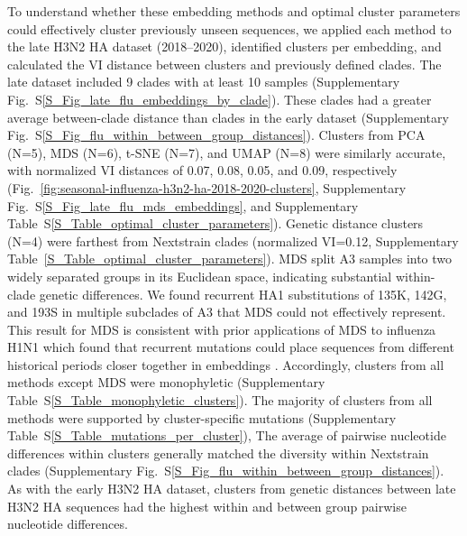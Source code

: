 \documentclass[webpdf,contemporary,large,single]{oup-authoring-template}%
\theoremstyle{thmstyleone}%
\theoremstyle{thmstyletwo}%
\theoremstyle{thmstylethree}%
\begin{document}
To understand whether these embedding methods and optimal cluster parameters could effectively cluster previously unseen sequences, we applied each method to the late H3N2 HA dataset (2018--2020), identified clusters per embedding, and calculated the VI distance between clusters and previously defined clades.
The late dataset included 9 clades with at least 10 samples (Supplementary Fig.~S\ref{S_Fig_late_flu_embeddings_by_clade}).
These clades had a greater average between-clade distance than clades in the early dataset (Supplementary Fig.~S\ref{S_Fig_flu_within_between_group_distances}).
Clusters from PCA (N=5), MDS (N=6), t-SNE (N=7), and UMAP (N=8) were similarly accurate, with normalized VI distances of 0.07, 0.08, 0.05, and 0.09, respectively (Fig.~\ref{fig:seasonal-influenza-h3n2-ha-2018-2020-clusters}, Supplementary Fig.~S\ref{S_Fig_late_flu_mds_embeddings}, and Supplementary Table~S\ref{S_Table_optimal_cluster_parameters}).
Genetic distance clusters (N=4) were farthest from Nextstrain clades (normalized VI=0.12, Supplementary Table~\ref{S_Table_optimal_cluster_parameters}).
MDS split A3 samples into two widely separated groups in its Euclidean space, indicating substantial within-clade genetic differences.
We found recurrent HA1 substitutions of 135K, 142G, and 193S in multiple subclades of A3 that MDS could not effectively represent.
This result for MDS is consistent with prior applications of MDS to influenza H1N1 which found that recurrent mutations could place sequences from different historical periods closer together in embeddings \citep{Ito2011}.
Accordingly, clusters from all methods except MDS were monophyletic (Supplementary Table~S\ref{S_Table_monophyletic_clusters}).
The majority of clusters from all methods were supported by cluster-specific mutations (Supplementary Table~S\ref{S_Table_mutations_per_cluster}),
The average of pairwise nucleotide differences within clusters generally matched the diversity within Nextstrain clades (Supplementary Fig.~S\ref{S_Fig_flu_within_between_group_distances}).
As with the early H3N2 HA dataset, clusters from genetic distances between late H3N2 HA sequences had the highest within and between group pairwise nucleotide differences.
\end{document}
